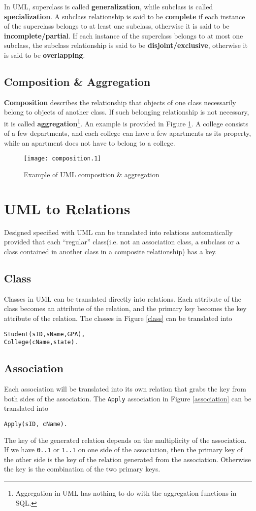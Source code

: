 In UML, superclass is called \textbf{generalization}, while subclass is called \textbf{specialization}. A subclass relationship is said to be \textbf{complete} if each instance of the superclass belongs to at least one subclass, otherwise it is said to be \textbf{incomplete/partial}. If each instance of the superclass belongs to at most one subclass, the subclass relationship is said to be \textbf{disjoint/exclusive}, otherwise it is said to be \textbf{overlapping}.
\subsection{Composition \& Aggregation}
\textbf{Composition} describes the relationship that objects of one class necessarily belong to objects of another class. If such belonging relationship is not necessary, it is called \textbf{aggregation}\footnote{Aggregation in UML has nothing to do with the aggregation functions in SQL.}. An example is provided in Figure \ref{composition}. A college consists of a few departments, and each college can have a few apartments as its property, while an apartment does not have to belong to a college.
\begin{figure}[ht]
\centering
\texttt{[image: composition.1]}
\caption{Example of UML composition \& aggregation}\label{composition}
\end{figure}
\section{UML to Relations}
Designed specified with UML can be translated into relations automatically provided that each ``regular'' class(i.e. not an association class, a subclass or a class contained in another class in a composite relationship) has a key. 
\subsection{Class}
Classes in UML can be translated directly into relations. Each attribute of the class becomes an attribute of the relation, and the primary key becomes the key attribute of the relation. The classes in Figure \ref{class} can be translated into 
\begin{lstlisting}
Student(sID,sName,GPA),
College(cName,state).
\end{lstlisting}
\subsection{Association}
Each association will be translated into its own relation that grabs the key from both sides of the association. The \texttt{Apply} association in Figure \ref{association} can be translated into 
\begin{lstlisting}
Apply(sID, cName).
\end{lstlisting}
The key of the generated relation depends on the multiplicity of the association. If we have \texttt{0..1} or \texttt{1..1} on one side of the association, then the primary key of the other side is the key of the relation generated from the association. Otherwise the key is the combination of the two primary keys.

